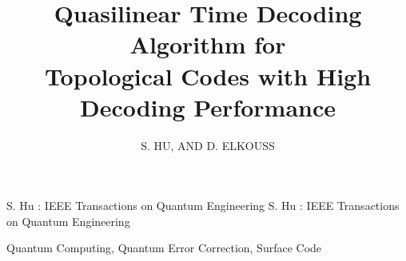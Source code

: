 \documentclass{ieeeaccess}
\begin{document}

\title{Quasilinear Time Decoding Algorithm for \\Topological Codes with High Decoding Performance}
\author{
    \uppercase{S. Hu},
    \uppercase{and D. Elkouss}
}
\address[1]{Department of Physics, Delft University of Technology (email: watermarkhu@outlook.com)}
\address[2]{QuTech, Delft University of Technology, Lorentzweg 1
2628CJ Delft, The Netherlands (email: d.elkousscoronas@qutech.nl)}


\markboth
{S. Hu \headeretal: IEEE Transactions on Quantum Engineering}
{S. Hu \headeretal: IEEE Transactions on Quantum Engineering}


\begin{abstract}
    
\end{abstract}

\begin{keywords}
    Quantum Computing, Quantum Error Correction, Surface Code
\end{keywords}

\titlepgskip=-15pt
\maketitle








\FloatBarrier
\printbibliography
\EOD
\end{document}
